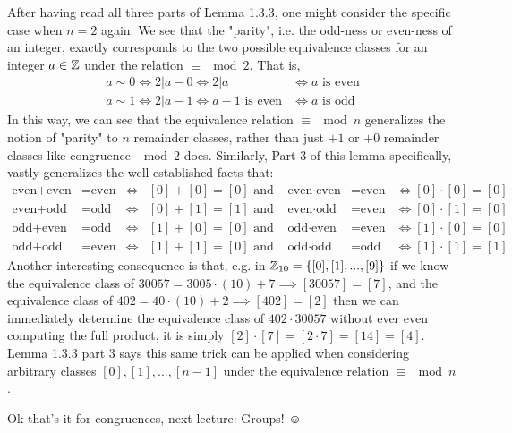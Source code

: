 \noindent After having read all three parts of Lemma 1.3.3, one might consider the specific case
when $n=2$ again. We see that the "parity", i.e. the odd-ness or even-ness of an integer, exactly
corresponds to the two possible equivalence classes for an integer $a\in {\mathbb{Z}}$ under the relation
$\equiv\mod 2$. That is,
\begin{align}
    a\sim0 \iff 2|a-0 \iff 2|a &\iff a \text{ is even} \nonumber \\
    a\sim1 \iff 2|a-1 \iff a-1 \text{ is even} &\iff a \text{ is odd} \nonumber
\end{align}
In this way, we can see that the equivalence relation $\equiv\mod n$ generalizes the notion of
"parity" to $n$ remainder classes, rather than just $+1$ or $+0$ remainder classes like congruence
$\mod 2$ does. Similarly, Part 3 of this lemma specifically, vastly generalizes the well-established
facts that:
\begin{align}
    \text{even}+\text{even}&=\text{even} &\iff &[0]+[0]=[0] \text{ \ \ and }& \text{even}\cdot \text{even} &=\text{even} &\iff [0]\cdot [0]=[0]\nonumber \\
    \text{even}+\text{odd}&=\text{odd} &\iff &[0]+[1]=[1] \text{ \ \ and }& \text{even}\cdot \text{odd} &=\text{even} &\iff [0]\cdot [1]=[0] \nonumber \\
    \text{odd}+\text{even}&=\text{odd} &\iff &[1]+[0]=[0] \text{ \ \ and }& \text{odd}\cdot \text{even} &=\text{even} &\iff [1]\cdot [0]=[0] \nonumber \\
    \text{odd}+\text{odd}&=\text{even} &\iff &[1]+[1]=[0] \text{ \ \ and }& \text{odd}\cdot \text{odd} &=\text{odd} &\iff [1]\cdot [1]=[1] \nonumber
\end{align}
Another interesting consequence is that, e.g. in ${\mathbb{Z}}_{10}=\{[0],[1],...,[9]\}$ if we know the
equivalence class of $30057=3005\cdot(10)+7 \implies [30057]=[7]$, and the equivalence class of
$402=40\cdot(10)+2 \implies [402]=[2]$ then we can immediately determine the equivalence class of
$402\cdot 30057$ without ever even computing the full product, it is simply
$[2]\cdot[7]=[2\cdot 7]=[14]=[4]$. Lemma 1.3.3 part 3 says this same trick can be applied when
considering arbitrary classes $[0], [1], ... , [n-1]$ under the equivalence relation
$\equiv \mod n$. \steezybreak

\noindent Ok that's it for congruences, next lecture: Groups! $\smiley{}$
